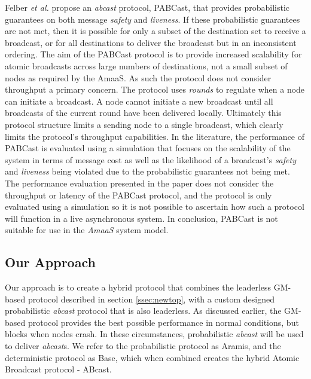     Felber \emph{et al.} \citep{Felber01probabilisticatomic} propose an \emph{abcast} protocol, \textsf{PABCast}, that provides probabilistic guarantees on both message \emph{safety} and \emph{liveness}.  If these probabilistic guarantees are not met, then it is possible for only a subset of the destination set to receive a broadcast, or for all destinations to deliver the broadcast but in an inconsistent ordering.  The aim of the  \textsf{PABCast} protocol is to provide increased scalability for atomic broadcasts across large numbers of destinations, not a small subset of nodes as required by the \textsf{AmaaS}.  As such the protocol does not consider throughput a primary concern.  The protocol uses \emph{rounds} to regulate when a node can initiate a broadcast.  A node cannot initiate a new broadcast until all broadcasts of the current round have been delivered locally.  Ultimately this protocol structure limits a sending node to a single broadcast, which clearly limits the protocol's throughput capabilities.  In the literature, the performance of \textsf{PABCast} is evaluated using a simulation that focuses on the scalability of the system in terms of message cost as well as the likelihood of a broadcast's \emph{safety} and \emph{liveness} being violated due to the probabilistic guarantees not being met. The performance evaluation presented in the paper does not consider the throughput or latency of the \textsf{PABCast} protocol, and the protocol is only evaluated using a simulation so it is not possible to ascertain how such a protocol will function in a live asynchronous system.  In conclusion, \textsf{PABCast} is not suitable for use in the \emph{AmaaS} system model.  
    
    \subsection{Our Approach}
    Our approach is to create a hybrid protocol that combines the leaderless GM-based protocol described in section \ref{ssec:newtop}, with a custom designed probabilistic \emph{abcast} protocol that is also leaderless.  As discussed earlier, the GM-based protocol provides the best possible performance in normal conditions, but blocks when nodes crash.  In these circumstances, probabilistic \emph{abcast} will be used to deliver \emph{abcast}s. We refer to the probabilistic protocol as \textsf{Aramis}, and the deterministic protocol as \textsf{Base}, which when combined creates the hybrid Atomic Broadcast protocol - \textsf{ABcast}.  
    
